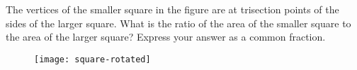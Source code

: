 The vertices of the smaller square in the figure are at trisection points of the sides of the larger square. What is the ratio of the area of the smaller square to the area of the larger square? Express your answer as a common fraction.

\begin{figure}[H]
\centering
\texttt{[image: square-rotated]}
\end{figure}
